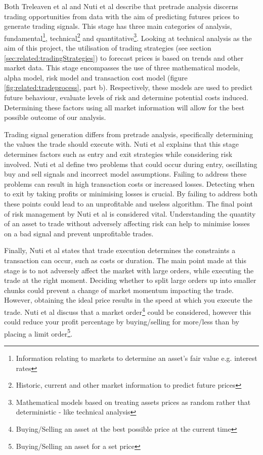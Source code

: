 Both Treleaven et al \cite{ART:Treleaven:2013} and Nuti et al \cite{ART:Nuti:2011} describe that pretrade analysis discerns trading opportunities from data with the aim of predicting futures prices to generate trading signals. This stage has three main categories of analysis, fundamental\footnote{Information relating to markets to determine an asset's fair value e.g. interest rates}, technical\footnote{Historic, current and other market information to predict future prices} and quantitative\footnote{Mathematical models based on treating assets prices as random rather that deterministic - like technical analysis}. Looking at technical analysis as the aim of this project, the utilisation of trading strategies (see section \ref{sec:related:tradingStrategies}) to forecast prices is based on trends and other market data. This stage encompasses the use of three mathematical models, alpha model, risk model and transaction cost model (figure \ref{fig:related:tradeprocess}, part b). Respectively, these models are used to predict future behaviour, evaluate levels of risk and determine potential costs induced. Determining these factors using all market information will allow for the best possible outcome of our analysis.

Trading signal generation differs from pretrade analysis, specifically determining the values the trade should execute with. Nuti et al \cite{ART:Nuti:2011} explains that this stage determines factors such as entry and exit strategies while considering risk involved. Nuti et al define two problems that could occur during entry, oscillating buy and sell signals and incorrect model assumptions. Failing to address these problems can result in high transaction costs or increased losses. Detecting when to exit by taking profits or minimising losses is crucial. By failing to address both these points could lead to an unprofitable and useless algorithm. The final point of risk management by Nuti et al is considered vital. Understanding the quantity of an asset to trade without adversely affecting risk can help to minimise losses on a bad signal and prevent unprofitable trades.

Finally, Nuti et al \cite{ART:Nuti:2011} states that trade execution determines the constraints a transaction can occur, such as costs or duration. The main point made at this stage is to not adversely affect the market with large orders, while executing the trade at the right moment. Deciding whether to split large orders up into smaller chunks could prevent a change of market momentum impacting the trade. However, obtaining the ideal price results in the speed at which you execute the trade. Nuti et al discuss that a market order\footnote{Buying/Selling an asset at the best possible price at the current time} could be considered, however this could reduce your profit percentage by buying/selling for more/less than by placing a limit order\footnote{Buying/Selling an asset for a set price}.

